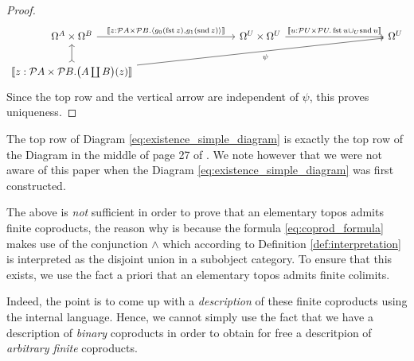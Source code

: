 \documentclass{tac}
\newcommand{\call}[1]{\mathcal{#1}}
\begin{document}
\begin{proof}
\begin{equation}
{			\begin{tikzcd}[column sep = huge]
				\Omega^A \times \Omega^B\arrow[rr, "{\llbracket z: \call{P}A \times \call{P}B.  \langle g_0(\operatorname{fst}z),g_1(\operatorname{snd}z)\rangle\rrbracket}"] & & \Omega^U \times \Omega^U\arrow[rr,"{\llbracket u: \call{P}U \times \call{P}U . \operatorname{fst}u \cup_U \operatorname{snd}u \rrbracket}"] & & \Omega^U\\
				\llbracket z: \call{P}A \times \call{P}B. \big(A \coprod B\big)(z) \rrbracket\arrow[u,rightarrowtail]\arrow[rrrru,swap,"{\psi}"]
			\end{tikzcd}}
		\end{equation}
		Since the top row and the vertical arrow are independent of $\psi$, this proves uniqueness.
	\end{proof}
	\begin{remark}
		The top row of Diagram \eqref{eq:existence_simple_diagram} is exactly the top row of the Diagram in the middle of page 27 of \cite{Mikkelson}. We note however that we were not aware of this paper when the Diagram \eqref{eq:existence_simple_diagram} was first constructed.
	\end{remark}
The above is \emph{not} sufficient in order to prove that an elementary topos admits finite coproducts, the reason why is because the formula \eqref{eq:coprod_formula} makes use of the conjunction $\wedge$ which according to Definition \ref{def:interpretation} is interpreted as the disjoint union in a subobject category. To ensure that this exists, we use the fact a priori that an elementary topos admits finite colimits.

Indeed, the point is to come up with a \emph{description} of these finite coproducts using the internal language. Hence, we cannot simply use the fact that we have a description of \emph{binary} coproducts in order to obtain for free a descritpion of \emph{arbitrary finite} coproducts.
\end{document}
